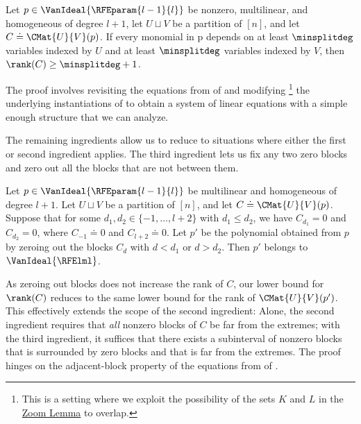 \documentclass{toc}
\begin{document}
\begin{lemma}
  \label{lem.application.roabp.core}
  Let \(p\in\VanIdeal{\RFEparam{l-1}{l}}\) be nonzero, multilinear, and
  homogeneous of degree \(l+1\),
  let \(U\sqcup V\) be a partition of \([n]\),
  and let \(C \doteq \CMat{U}{V}(p)\).
  If every monomial in p depends on at least $\minsplitdeg$ variables indexed
  by $U$ and at least $\minsplitdeg$ variables indexed by $V$,
  then \(\rank(C) \ge \minsplitdeg+1\).
\end{lemma}

The proof involves revisiting the equations from  of  and modifying%
\footnote{This is a setting where we exploit the possibility of the sets $K$ and $L$ in the \hyperref[lem.multi-zsub-deriv]{Zoom Lemma} to overlap.}
the underlying instantiations of  to obtain a system of linear equations with a simple enough structure that we can analyze.

The remaining ingredients allow us to reduce to situations where either the
first or second ingredient applies.
The third ingredient lets us fix any two zero blocks
and zero out all the blocks that are not between them.

\begin{proposition}\label{prop:ROABP:zero}
  Let $p\in\VanIdeal{\RFEparam{l-1}{l}}$ be multilinear
  and homogeneous of degree $l+1$.
  Let $U\sqcup V$ be a partition of $[n]$,
  and let $C \doteq \CMat{U}{V}(p)$.
  Suppose that for some $d_1,d_2 \in \{-1,\dots,l+2\}$ with $d_1 \le d_2$,
  we have $C_{d_1} = 0$ and $C_{d_2} = 0$,
  where \(C_{-1} \doteq 0\) and \(C_{l+2} \doteq 0\).
  Let $p'$ be the polynomial obtained from $p$ by zeroing out the blocks
  $C_d$ with $d < d_1$ or $d > d_2$.
  Then $p'$ belongs to $\VanIdeal{\RFElml}$.
\end{proposition}

As zeroing out blocks does not increase the rank of \(C\),
our lower bound for \(\rank(C)\) reduces to the same lower bound for the rank
of \(\CMat{U}{V}(p')\).
This effectively extends the scope of the second ingredient:
Alone, the second ingredient requires that \emph{all} nonzero blocks of \(C\)
be far from the extremes;
with the third ingredient,
it suffices that there exists a subinterval of nonzero blocks that is surrounded by zero blocks and that is far from the extremes.
The proof hinges on the adjacent-block property of the equations from  of .
\end{document}
